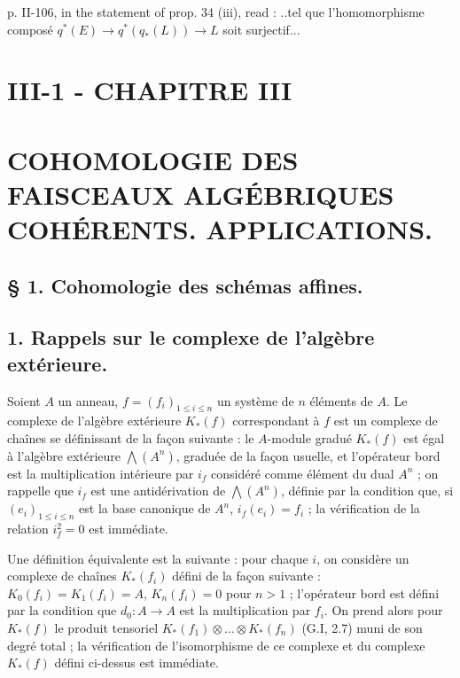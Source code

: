 p. II-106, in the statement of prop. 34 (iii), read :
..tel que l'homomorphisme composé $q^*(E) \to q^*(q_*(L)) \to L$ soit surjectif...

\newpage



\section*{III-1 - CHAPITRE III}

\section*{COHOMOLOGIE DES FAISCEAUX ALGÉBRIQUES COHÉRENTS. APPLICATIONS.}

\subsection*{§ 1. Cohomologie des schémas affines.}

\subsection*{1. Rappels sur le complexe de l'algèbre extérieure.}

Soient $A$ un anneau, $f = (f_i)_{1 \le i \le n}$ un système de $n$ éléments de $A$.
Le complexe de l'algèbre extérieure $K_*(f)$ correspondant à $f$ est un complexe de chaînes se définissant de la façon suivante : le $A$-module gradué $K_*(f)$ est égal à l'algèbre extérieure $\bigwedge(A^n)$, graduée de la façon usuelle, et l'opérateur bord est la multiplication intérieure par $i_f$ considéré comme élément du dual $A^n$ ; on rappelle que $i_f$ est une antidérivation de $\bigwedge(A^n)$, définie par la condition que, si $(e_i)_{1 \le i \le n}$ est la base canonique de $A^n$, $i_f(e_i) = f_i$ ; la vérification de la relation $i_f^2 = 0$ est immédiate.

Une définition équivalente est la suivante : pour chaque $i$, on considère un complexe de chaînes $K_*(f_i)$ défini de la façon suivante : $K_0(f_i) = K_1(f_i) = A$, $K_n(f_i) = 0$ pour $n > 1$ ; l'opérateur bord est défini par la condition que $d_0 : A \to A$ est la multiplication par $f_i$. On prend alors pour $K_*(f)$ le produit tensoriel $K_*(f_1) \otimes \dots \otimes K_*(f_n)$ (G.I, 2.7) muni de son degré total ; la vérification de l'isomorphisme de ce complexe et du complexe $K_*(f)$ défini ci-dessus est immédiate.

